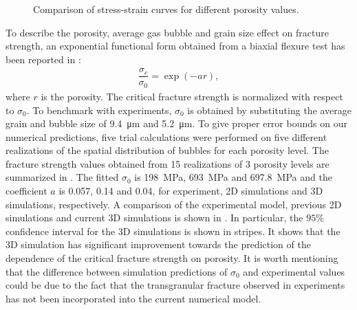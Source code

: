 \begin{figure}[!htb]
  \centering
  \caption{Comparison of stress-strain curves for different porosity values.}
  \label{fig_porosity}
\end{figure}

To describe the porosity, average gas bubble and grain size effect on fracture strength, an exponential functional form obtained from a biaxial flexure test has been reported in \cite{oguma_1982}:
\begin{align}
  \dfrac{\sigma_c}{\sigma_0} = \exp(-a r),
\end{align}
where $r$ is the porosity. The critical fracture strength is normalized with respect to $\sigma_0$. To benchmark with experiments, $\sigma_0$ is obtained by substituting the average grain and bubble size of \SI{9.4}{\micro\meter} and \SI{5.2}{\micro\meter}. To give proper error bounds on our numerical predictions, five trial calculations were performed on five different realizations of the spatial distribution of bubbles for each porosity level. The fracture strength values obtained from 15 realizations of 3 porosity levels are summarized in . The fitted $\sigma_0$ is \SI{198}{\mega\pascal}, \SI{693}{\mega\pascal} and \SI{697.8}{\mega\pascal} and the coefficient $a$ is 0.057, 0.14 and 0.04, for experiment, 2D simulations and 3D simulations, respectively.
A comparison of the experimental model, previous 2D simulations \cite{pritam_2016} and current 3D simulations is shown in . In particular, the $95\%$ confidence interval for the 3D simulations is shown in stripes. It shows that the 3D simulation has significant improvement towards the prediction of the dependence of the critical fracture strength on porosity. It is worth mentioning that the difference between simulation predictions of $\sigma_0$ and experimental values could be due to the fact that the transgranular fracture observed in experiments \cite{evans_1969} has not been incorporated into the current numerical model.


